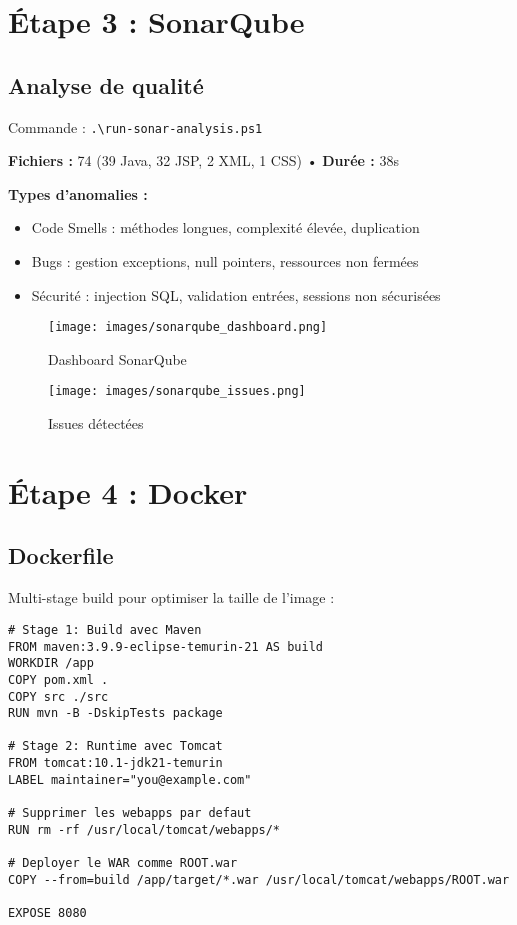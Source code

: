 \documentclass[11pt,a4paper]{article}
\begin{document}
\newpage

\section{Étape 3 : SonarQube}

\subsection{Analyse de qualité}
Commande : \texttt{.\textbackslash run-sonar-analysis.ps1}

\begin{tcolorbox}[colback=blue!5!white,colframe=blue!75!black,title=Résultats]
    \textbf{Fichiers :} 74 (39 Java, 32 JSP, 2 XML, 1 CSS) • \textbf{Durée :} 38s
\end{tcolorbox}

\textbf{Types d'anomalies :}
\begin{itemize}
    \item Code Smells : méthodes longues, complexité élevée, duplication
    \item Bugs : gestion exceptions, null pointers, ressources non fermées
    \item Sécurité : injection SQL, validation entrées, sessions non sécurisées
\end{itemize}

\begin{figure}[H]
    \centering
    \texttt{[image: images/sonarqube\_dashboard.png]}
    \caption{Dashboard SonarQube}
\end{figure}

\begin{figure}[H]
    \centering
    \texttt{[image: images/sonarqube\_issues.png]}
    \caption{Issues détectées}
\end{figure}

\newpage

\section{Étape 4 : Docker}

\subsection{Dockerfile}
Multi-stage build pour optimiser la taille de l'image :

\begin{lstlisting}[language=docker]
# Stage 1: Build avec Maven
FROM maven:3.9.9-eclipse-temurin-21 AS build
WORKDIR /app
COPY pom.xml .
COPY src ./src
RUN mvn -B -DskipTests package

# Stage 2: Runtime avec Tomcat
FROM tomcat:10.1-jdk21-temurin
LABEL maintainer="you@example.com"

# Supprimer les webapps par defaut
RUN rm -rf /usr/local/tomcat/webapps/*

# Deployer le WAR comme ROOT.war
COPY --from=build /app/target/*.war /usr/local/tomcat/webapps/ROOT.war

EXPOSE 8080
\end{lstlisting}
\end{document}
